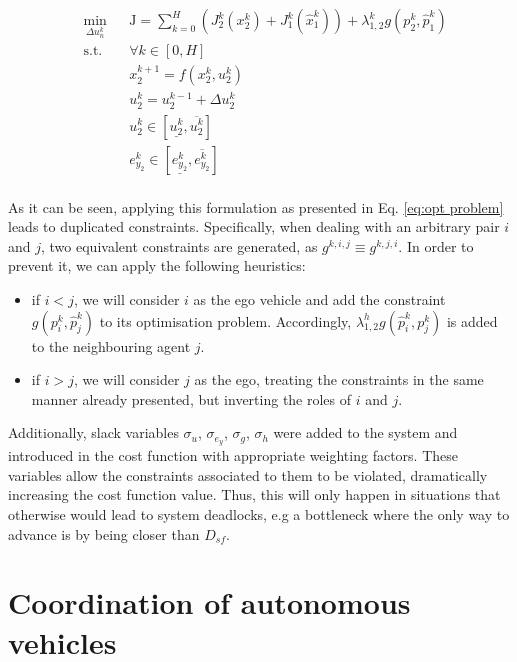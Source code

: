 \documentclass[letterpaper, 10 pt, conference]{ieeeconf}  %
\begin{document}
\begin{equation}
\begin{aligned}
    \label{eq:slave_agent}
    & \underset{\Delta u^k_n}{\text{min}} && \mathrm{J}=\sum_{k=0}^{H} ( J^k_2(x^k_2) + J^k_1(\hat{x}^k_1))  + \lambda^k_{1,2}g(p^k_2,\hat{p}^k_1)\\
    & \text{s.t.} &&\forall k \in [0,H]\\
    & && x^{k+1}_2 = f(x^{k}_2,u^{k}_2)\\
    & && u^k_2 = u^{k-1}_{2} + \Delta u^k_2 \\ 
    & && u^k_2 \in [\underline{u^k_2}, \overline{u^k_2} ] \\
    & && e_{y_{2}}^{k} \in [\underline{e_{y_{2}}^{k}}, \overline{e_{y_{2}}^{k}} ] \\
\end{aligned}
\end{equation}

As it can be seen, applying this formulation as presented in Eq. \eqref{eq:opt problem} leads to duplicated constraints. Specifically, when dealing with an arbitrary pair $i$ and $j$, two equivalent constraints are generated, as $g^{k,i,j} \equiv g^{k,j,i}$. In order to prevent it, we can apply the following heuristics:     
    
    \begin{itemize}
        \item if $i<j$, we will consider $i$ as the ego vehicle and add the constraint $ g( p^{k}_i, \hat{p}^{k}_j)$ to its optimisation problem. Accordingly,  $\lambda^h_{1,2} g( \hat{p}^{k}_i, p^{k}_j)$ is added to the neighbouring agent $j$. 
        \item if $i>j$, we will consider $j$ as the ego, treating the constraints in the same manner already presented, but inverting the roles of $i$ and $j$. 
    \end{itemize}
    
Additionally, slack variables $\sigma_u$, $\sigma_{e_y}$, $\sigma_g$, $\sigma_h$ were added to the system and introduced in the cost function with appropriate weighting factors. These variables allow the constraints associated to them to be violated, dramatically increasing the cost function value. Thus, this will only happen in situations that otherwise would lead to system deadlocks, e.g a bottleneck where the only way to advance is by being closer than $D_{sf}$. \\ 

\section{Coordination of autonomous vehicles}
\label{seq:CaseStudy}
\end{document}
